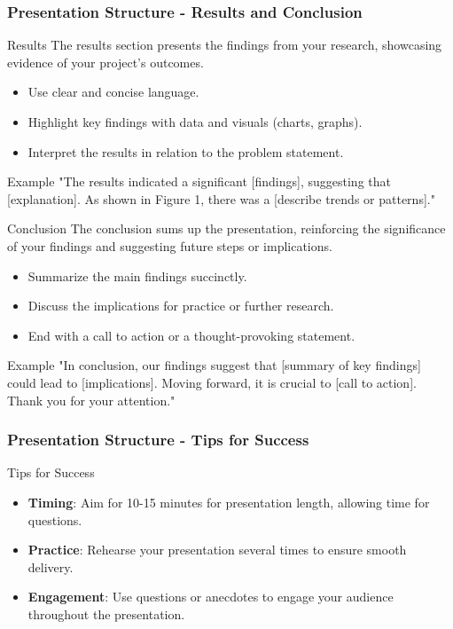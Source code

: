 \documentclass{beamer}
\begin{document}
\begin{frame}[fragile]
    \frametitle{Presentation Structure - Results and Conclusion}
    \begin{block}{Results}
        The results section presents the findings from your research, showcasing evidence of your project's outcomes.
    \end{block}
    \begin{itemize}
        \item Use clear and concise language.
        \item Highlight key findings with data and visuals (charts, graphs).
        \item Interpret the results in relation to the problem statement.
    \end{itemize}
    \begin{exampleblock}{Example}
        "The results indicated a significant [findings], suggesting that [explanation]. As shown in Figure 1, there was a [describe trends or patterns]."
    \end{exampleblock}

    \begin{block}{Conclusion}
        The conclusion sums up the presentation, reinforcing the significance of your findings and suggesting future steps or implications.
    \end{block}
    \begin{itemize}
        \item Summarize the main findings succinctly.
        \item Discuss the implications for practice or further research.
        \item End with a call to action or a thought-provoking statement.
    \end{itemize}
    \begin{exampleblock}{Example}
        "In conclusion, our findings suggest that [summary of key findings] could lead to [implications]. Moving forward, it is crucial to [call to action]. Thank you for your attention."
    \end{exampleblock}
\end{frame}

\begin{frame}[fragile]
    \frametitle{Presentation Structure - Tips for Success}
    \begin{block}{Tips for Success}
        \begin{itemize}
            \item \textbf{Timing}: Aim for 10-15 minutes for presentation length, allowing time for questions.
            \item \textbf{Practice}: Rehearse your presentation several times to ensure smooth delivery.
            \item \textbf{Engagement}: Use questions or anecdotes to engage your audience throughout the presentation.
        \end{itemize}
    \end{block}
\end{frame}
\end{document}
